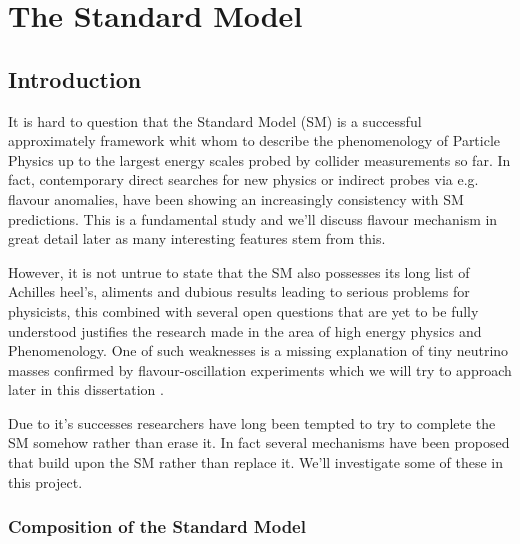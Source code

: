 \chapter{The Standard Model}
\label{ch:SM}

\section{Introduction}

It is hard to question that the Standard Model (SM) is a successful approximately framework whit whom to describe the phenomenology of Particle Physics up to the largest energy scales probed by collider measurements so far. In fact, contemporary direct searches for new physics or indirect probes via e.g. flavour anomalies, have been showing an increasingly consistency with SM predictions. { \color{blue} This is a fundamental study and we'll discuss flavour mechanism in great detail later as many interesting features stem from this. } 

However, it is not untrue to state that the SM also possesses its long list of Achilles heel's, aliments and dubious results leading to serious problems for physicists, this combined with several open questions that are yet to be fully understood justifies the research made in the area of high energy physics and Phenomenology. One of such weaknesses is a missing explanation of tiny neutrino masses confirmed by flavour-oscillation experiments { \color{blue} which we will try to approach later in this dissertation }.  

Due to it's successes researchers have long been tempted to try to complete the SM somehow rather than erase it. In fact several mechanisms have been proposed that build upon the SM rather than replace it. { \color{blue}  We'll investigate some of these in this project. } 

\subsection{Composition of the Standard Model}

